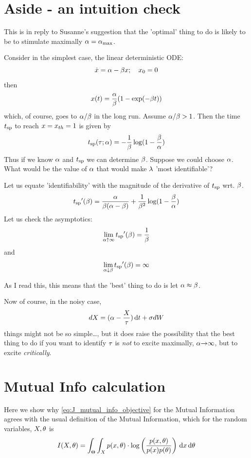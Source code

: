 \documentclass{article}
\begin{document}
% 


\section{Aside - an intuition check}
\label{sec:alpha_crit_is_best_hypothesis}
This is in reply to Susanne's suggestion that the 'optimal' thing to do is
likely to be to stimulate maximally ${\alpha} = { {\alpha}_{\textrm{max}} }$. 

Consider in the simplest case, the linear deterministic ODE:
$$
\dot{x} = {\alpha} - {\beta}  x; \quad x_0 = 0
$$
then
$$
x(t) =  \frac{{\alpha}}{{\beta}} (1 - \exp(- {\beta} t))
$$
which, of course, goes to ${\alpha}/ {\beta}$ in the long run. 
Assume ${\alpha}/{\beta} > 1$. Then the time ${ t_{\textrm{sp} } }$ to reach $x = { x_{th} } = 1$
is given by
$$
{ t_{\textrm{sp} } } ({\tau}; {\alpha}) = -\frac 1{{\beta}}  \log( 1- \frac{{\beta}}{{\alpha} })
$$
Thus if we know
${\alpha}$ and ${ t_{\textrm{sp} } }$ we can determine ${\beta}$. Suppose we could choose ${\alpha}$. What would
be the value of ${\alpha}$ that would make ${\lambda}$ 'most identifiable'?

Let us equate 'identifiability' with the magnitude of the derivative of ${ t_{\textrm{sp} } }$
wrt. ${\beta}$.
$$
{ t_{\textrm{sp} } }'({\beta}) = \frac{{\alpha}}{{\beta} ( {\alpha} - {\beta})}  + \frac{1}{{\beta}^2}\log(1-\frac{{\beta}}{{\alpha} })   
$$
Let us check the asymptotics:
$$
\lim_{{\alpha} \uparrow \infty} { t_{\textrm{sp} } }'({\beta}) = \frac 1{{\beta}}
$$
and 
$$
\lim_{{\alpha} \downarrow {\beta}} { t_{\textrm{sp} } }'({\beta}) =  \infty
$$
 
As I read this, this means that the 'best' thing to do is let ${\alpha} \approx {\beta}$.

Now of course, in the noisy case, 
$$
dX = ({\alpha} - \frac{X}{{\tau}}) \, \mathrm{d} t + {\sigma } dW 
$$
things might not be so simple\ldots, but it does raise the possibility that the
best thing to do if you want to identify ${\tau}$ is {\itshape not} to excite
maximally, ${\alpha} {\rightarrow} \infty$, but to excite {\itshape critically}.

\section{Mutual Info calculation}
\label{sec:mutual_info_defn} 

Here we show why \cref{eq:J_mutual_info_objective} for the Mutual Information
agrees with the usual definition of the Mutual Information, which for the random variables, $X,{\theta}$ is
\begin{equation}
I(X,{\theta}) = \int_\Theta \int_X p(x,{\theta}) \cdot \log \left(
\frac{p(x,{\theta})}{p(x)p({\theta})}\right) \, \mathrm{d} x \, \mathrm{d} {\theta}
\label{eq:mutual_info_defn}
\end{equation}
 
\end{document}
